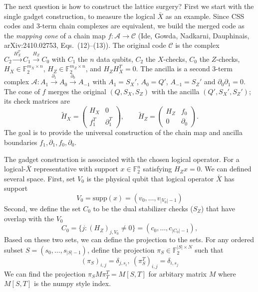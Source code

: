 \documentclass[a4paper, 12pt]{article}
\begin{document}
The next question is how to construct the lattice surgery? First we start with the single gadget construction, to measure the logical $\bar{X}$ as an example. Since CSS codes and $3$-term chain complexes are equivalent, we build the merged code as the \emph{mapping cone} of a chain map $f:\mathcal{A}\to\mathcal{C}$ (Ide, Gowda, Nadkarni, Dauphinais, arXiv:2410.02753, Eqs.~(12)--(13)). The original code $\mathcal{C}$ is the complex $C_2 \xrightarrow{H_X^T} C_1 \xrightarrow{H_Z} C_0$ with $C_1$ the $n$ data qubits, $C_2$ the $X$-checks, $C_0$ the $Z$-checks, $H_X \in \mathbb{F}_2^{m_X \times n}$, $H_Z \in \mathbb{F}_2^{m_Z \times n}$, and $H_Z H_X^T = 0$. The ancilla is a second $3$-term complex $\mathcal{A}: A_1 \xrightarrow{\partial_1} A_0 \xrightarrow{\partial_0} A_{-1}$ with $A_1 = S_X'$, $A_0 = Q'$, $A_{-1} = S_Z'$ and $\partial_0\partial_1 = 0$. The cone of $f$ merges the original $(Q, S_X, S_Z)$ with the ancilla $(Q', S_X', S_Z')$; its check matrices are
\begin{equation}
    \tilde{H}_X = \begin{pmatrix}
        H_X & 0 \\
        f_1^T & \partial_1^T
    \end{pmatrix},
    \qquad 
    \tilde{H}_Z=\begin{pmatrix}
        H_Z & f_0 \\
        0 & \partial_0
    \end{pmatrix}.
\end{equation}
The goal is to provide the universal construction of the chain map and ancilla boundaries $f_1, \partial_1, f_0, \partial_0$.

The gadget construction is associated with the chosen logical operator. For a logical-$\bar X$ representative with support
  $x \in \mathbb{F}_2^n$ satisfying $H_Z x = 0$. We can defined several space. First, set $V_0$ is the physical qubit that logical operator $\bar{X}$ has support
  \begin{equation}
      V_0 = \mathrm{supp}(x) = (v_0,\dots,v_{|V_0|-1})
  \end{equation}
 Second, we define the set $C_0$ to be the dual stabilizer checks ($S_Z$) that have overlap with the $V_0$
 \begin{equation}
     C_0 = \{j : (H_Z)_{j,V_0} \neq 0 \} = (c_0,\dots,c_{|C_0|-1}),
  \end{equation}
Based on these two sets, we can define the projection to the sets. For any ordered subset $S=(s_0,\dots,s_{|S|-1})$, define the projection $\pi_S \in \mathbb{F}_2^{|S|\times N}$ such that
  \begin{equation}
  (\pi_S)_{i,j} = \delta_{j,s_i},\ (\pi_S^T)_{i,j} = \delta_{i, s_j} 
  \end{equation}
  We can find the projection $\pi_S M \pi_T^{T} = M[S,T]$ for arbitary matrix $M$ where $M[S,T]$ is the numpy style index.
  
\end{document}

